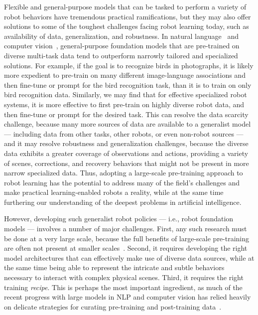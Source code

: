 Flexible and general-purpose models that can be tasked to perform a variety of robot behaviors have tremendous practical ramifications, but they may also offer solutions to some of the toughest challenges facing robot learning today, such as availability of data, generalization, and robustness. In natural language~\citep{achiam2023gpt} and computer vision~\citep{radford2021learning}, general-purpose foundation models that are pre-trained on diverse multi-task data tend to outperform narrowly tailored and specialized solutions. For example, if the goal is to recognize birds in photographs, it is likely more expedient to pre-train on many different image-language associations and then fine-tune or prompt for the bird recognition task, than it is to train on only bird recognition data. Similarly, we may find that for effective specialized robot systems, it is more effective to first pre-train on highly diverse robot data, and then fine-tune or prompt for the desired task. This can resolve the data scarcity challenge, because many more sources of data are available to a generalist model --- including data from other tasks, other robots, or even non-robot sources --- and it may resolve robustness and generalization challenges, because the diverse data exhibits a greater coverage of observations and actions, providing a variety of scenes, corrections, and recovery behaviors that might not be present in more narrow specialized data. Thus, adopting a large-scale pre-training approach to robot learning has the potential to address many of the field's challenges and make practical learning-enabled robots a reality, while at the same time furthering our understanding of the deepest problems in artificial intelligence.

However, developing such generalist robot policies --- i.e., robot foundation models --- involves a number of major challenges. First, any such research must be done at a very large scale, because the full benefits of large-scale pre-training are often not present at smaller scales~\citep{wei2022emergent}. Second, it requires developing the right model architectures that can effectively make use of diverse data sources, while at the same time being able to represent the intricate and subtle behaviors necessary to interact with complex physical scenes. Third, it requires the right training \emph{recipe}. This is perhaps the most important ingredient, as much of the recent progress with large models in NLP and computer vision has relied heavily on delicate strategies for curating pre-training and post-training data~\citep{ouyang2022traininglanguagemodelsfollow}.

